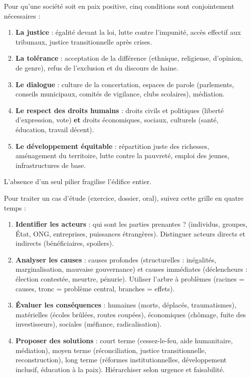 \documentclass[11pt]{article}
\begin{document}
\begin{propriete}
Pour qu'une société soit en paix positive, cinq conditions sont conjointement nécessaires :
\begin{enumerate}
    \item \textbf{La justice} : égalité devant la loi, lutte contre l'impunité, accès effectif aux tribunaux, justice transitionnelle après crises.
    \item \textbf{La tolérance} : acceptation de la différence (ethnique, religieuse, d'opinion, de genre), refus de l'exclusion et du discours de haine.
    \item \textbf{Le dialogue} : culture de la concertation, espaces de parole (parlements, conseils municipaux, comités de vigilance, clubs scolaires), médiation.
    \item \textbf{Le respect des droits humains} : droits civils et politiques (liberté d'expression, vote) \textbf{et} droits économiques, sociaux, culturels (santé, éducation, travail décent).
    \item \textbf{Le développement équitable} : répartition juste des richesses, aménagement du territoire, lutte contre la pauvreté, emploi des jeunes, infrastructures de base.
\end{enumerate}
L'absence d'un seul pilier fragilise l'édifice entier.
\end{propriete}

\begin{methode}
Pour traiter un cas d'étude (exercice, dossier, oral), suivez cette grille en quatre temps :
\begin{enumerate}
    \item \textbf{Identifier les acteurs} : qui sont les parties prenantes ? (individus, groupes, État, ONG, entreprises, puissances étrangères). Distinguer acteurs directs et indirects (bénéficiaires, spoilers).
    \item \textbf{Analyser les causes} : causes profondes (structurelles : inégalités, marginalisation, mauvaise gouvernance) et causes immédiates (déclencheurs : élection contestée, meurtre, pénurie). Utiliser l'arbre à problèmes (racines = causes, tronc = problème central, branches = effets).
    \item \textbf{Évaluer les conséquences} : humaines (morts, déplacés, traumatismes), matérielles (écoles brûlées, routes coupées), économiques (chômage, fuite des investisseurs), sociales (méfiance, radicalisation).
    \item \textbf{Proposer des solutions} : court terme (cessez-le-feu, aide humanitaire, médiation), moyen terme (réconciliation, justice transitionnelle, reconstruction), long terme (réformes institutionnelles, développement inclusif, éducation à la paix). Hiérarchiser selon urgence et faisabilité.
\end{enumerate}
\end{methode}
\end{document}

